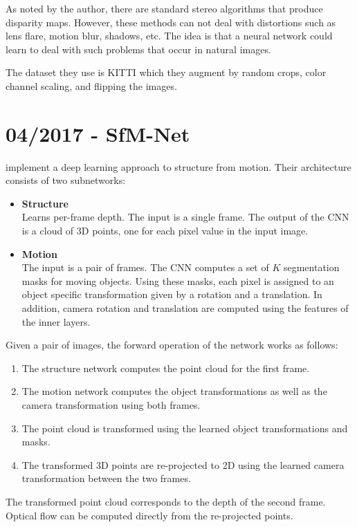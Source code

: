 		As noted by the author, there are standard stereo algorithms that produce disparity maps.
		However, these methods can not deal with distortions such as lens flare, motion blur, shadows, etc.
		The idea is that a neural network could learn to deal with such problems that occur in natural images.
		
		The dataset they use is {KITTI} \cite{Geiger2012KITTI} which they augment by random crops, color channel scaling, and flipping the images.
		
	
	\section{04/2017 - SfM-Net}
		
		\cite{SFMNET} implement a deep learning approach to structure from motion. 
		Their architecture consists of two subnetworks:
		\begin{itemize}
			\item \textbf{Structure}
				\\
				Learns per-frame depth.
				The input is a single frame. 
				The output of the CNN is a cloud of 3D points, one for each pixel value in the input image.
			\item \textbf{Motion}
				\\
				The input is a pair of frames.
				The CNN computes a set of $K$ segmentation masks for moving objects. 
				Using these masks, each pixel is assigned to an object specific transformation given by a rotation and a translation.
				In addition, camera rotation and translation are computed using the features of the inner layers.
		\end{itemize}
		Given a pair of images, the forward operation of the network works as follows:
		\begin{enumerate}
			\item The structure network computes the point cloud for the first frame.
			\item The motion network computes the object transformations as well as the camera transformation using both frames.
			\item The point cloud is transformed using the learned object transformations and masks.
			\item The transformed 3D points are re-projected to 2D using the learned camera transformation between the two frames.
		\end{enumerate}
		The transformed point cloud corresponds to the depth of the second frame.
		Optical flow can be computed directly from the re-projected points.
		
